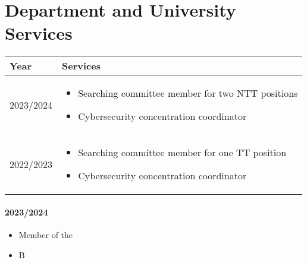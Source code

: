 
\section*{Department and University Services}

\begin{longtable}{|p{1in}|p{5in}|}
    \hline
    \rowcolor{lightgray}
    \textbf{Year}   &   \textbf{Services}\\
    \hline
    2023/2024   &   
    \begin{itemize}
        \item Searching committee member for two NTT positions
        \item  Cybersecurity concentration coordinator
    \end{itemize}
    \\
    \hline
    2022/2023   &  
    \begin{itemize}
        \item Searching committee member for one TT position
        \item  Cybersecurity concentration coordinator
    \end{itemize} 
    \\
    \hline
\end{longtable}
\paragraph{2023/2024}


\begin{itemize}
    \item Member of the 
    \item B
\end{itemize}